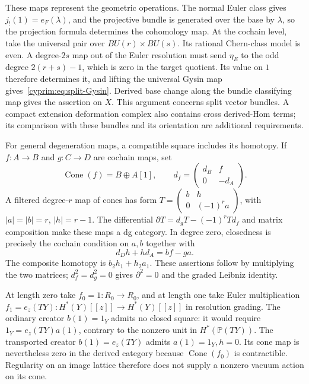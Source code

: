 These maps represent the geometric operations. The
normal Euler class gives $j_!(1)=e_F(\lambda)$, and
the projective bundle is generated over the base by
$\lambda$, so the projection formula determines the
cohomology map. At the cochain level, take the universal
pair over $BU(r)\times BU(s)$. Its rational Chern-class
model is even. A degree-$2s$ map out of the Euler
resolution must send $\eta_E$ to the odd degree
$2(r+s)-1$, which is zero in the target quotient.
Its value on $1$ therefore determines it, and lifting
the universal Gysin map gives~\eqref{cyprim:eq:split-Gysin}.
Derived base change along the bundle classifying map
gives the assertion on $X$. This argument concerns
split vector bundles. A compact extension deformation
complex also contains cross derived-Hom terms; its
comparison with these bundles and its orientation are
additional requirements.

For general degeneration maps, a compatible square
includes its homotopy. If $f:A\to B$ and $g:C\to D$
are cochain maps, set
\[
 \operatorname{Cone}(f)=B\oplus A[1],\qquad
 d_f=\begin{pmatrix}d_B&f\\0&-d_A\end{pmatrix}.
\]
A filtered degree-$r$ map of cones has form
$T=\left(\begin{smallmatrix}b&h\\0&(-1)^ra\end{smallmatrix}\right)$,
with $|a|=|b|=r$, $|h|=r-1$. The differential
$\partial T=d_gT-(-1)^rTd_f$ and matrix composition
make these maps a dg category. In degree zero,
closedness is precisely the cochain condition on
$a,b$ together with
\begin{equation}\label{cyprim:eq:cone-square}
 d_Dh+hd_A=bf-ga.
\end{equation}
The composite homotopy is $b_2h_1+h_2a_1$.
These assertions follow by multiplying the two
matrices; $d_f^2=d_g^2=0$ gives $\partial^2=0$
and the graded Leibniz identity.

At length zero take $f_0=1:R_0\to R_0$, and at
length one take Euler multiplication
$f_1=e_z(TY):H^*(Y)[[z]]\to H^*(Y)[[z]]$
in resolution grading. The ordinary creator
$b(1)=1_Y$ admits no closed square: it would require
$1_Y=e_z(TY)a(1)$, contrary to the nonzero unit in
$H^*(\mathbb P(TY))$. The transported creator
$b(1)=e_z(TY)$ admits $a(1)=1_Y,h=0$.
Its cone map is nevertheless zero in the derived
category because $\operatorname{Cone}(f_0)$ is
contractible. Regularity on an image lattice therefore
does not supply a nonzero vacuum action on its cone.

